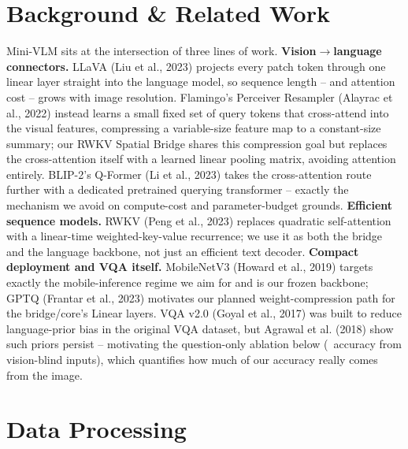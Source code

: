 \documentclass[final]{article}
\begin{document}
\section*{Background \& Related Work}

Mini-VLM sits at the intersection of three lines of work. \textbf{Vision$\to$language
connectors.} LLaVA (Liu et al., 2023) projects every patch token through one linear layer straight
into the language model, so sequence length -- and attention cost -- grows with image resolution.
Flamingo's Perceiver Resampler (Alayrac et al., 2022) instead learns a small fixed set of query
tokens that cross-attend into the visual features, compressing a variable-size feature map to a
constant-size summary; our RWKV Spatial Bridge shares this compression goal but replaces the
cross-attention itself with a learned linear pooling matrix, avoiding attention entirely. BLIP-2's
Q-Former (Li et al., 2023) takes the cross-attention route further with a dedicated pretrained
querying transformer -- exactly the mechanism we avoid on compute-cost and parameter-budget
grounds. \textbf{Efficient sequence models.} RWKV (Peng et al., 2023) replaces quadratic
self-attention with a linear-time weighted-key-value recurrence; we use it as both the bridge and
the language backbone, not just an efficient text decoder. \textbf{Compact deployment and VQA
itself.} MobileNetV3 (Howard et al., 2019) targets exactly the mobile-inference regime we aim for
and is our frozen backbone; GPTQ (Frantar et al., 2023) motivates our planned weight-compression
path for the bridge/core's Linear layers. VQA v2.0 (Goyal et al., 2017) was built to reduce
language-prior bias in the original VQA dataset, but Agrawal et al. (2018) show such priors
persist -- motivating the question-only ablation below (\blindFloor\ accuracy from vision-blind
inputs), which quantifies how much of our accuracy really comes from the image.

\section*{Data Processing}
\end{document}
